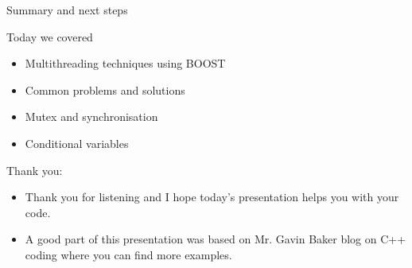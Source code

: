 \documentclass[8pt]{beamer}
\begin{document}
\begin{frame}{Summary and next steps}
 
\begin{block}{Today we covered}
 
\begin{itemize}
  \item Multithreading techniques using BOOST
  \item Common problems and solutions
  \item Mutex and synchronisation
  \item Conditional variables
\end{itemize}

\end{block}

\begin{block}{Thank you:}
 
\begin{itemize}
  \item Thank you for listening and I hope today's presentation helps you with your code.
  \item A good part of this presentation was based on Mr. Gavin Baker blog on C++ coding where you can find more examples.
\end{itemize}
 
\end{block}

\end{frame}
\end{document}

